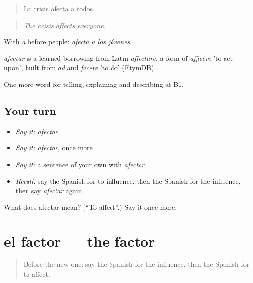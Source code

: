 \begin{quote}
La crisis afecta a todos.
\end{quote}

\begin{quote}
\emph{The crisis affects everyone.}
\end{quote}

With \emph{a} before people: \emph{afecta a los jóvenes}.

\begin{cousinweb}
\emph{afectar} is a learned borrowing from Latin \emph{affectare}, a form of \emph{afficere} 'to act upon', built from \emph{ad} and \emph{facere} 'to do' (EtymDB).
\end{cousinweb}

\begin{grammarlens}[title={What you've built}]
One more word for telling, explaining and describing at B1.
\end{grammarlens}

\subsection*{Your turn}
\begin{itemize}
\raggedright
  \item \emph{Say it:} \emph{afectar}
  \item \emph{Say it:} \emph{afectar}, once more
  \item \emph{Say it:} a sentence of your own with \emph{afectar}
  \item \emph{Recall:} say the Spanish for to influence, then the Spanish for the influence, then say \emph{afectar} again
\end{itemize}

\begin{tcolorbox}[breakable,colback=teal!4,colframe=teal!35!black,title={Before you move on}]
What does afectar mean? (\textquotedblleft{}To affect\textquotedblright{}.) Say it once more.
\end{tcolorbox}
\section[el factor]{el factor — the factor}

\label{lesson:ES-C583-factor}



\begin{quote}
Before the new one: say the Spanish for the influence, then the Spanish for to affect.
\end{quote}

